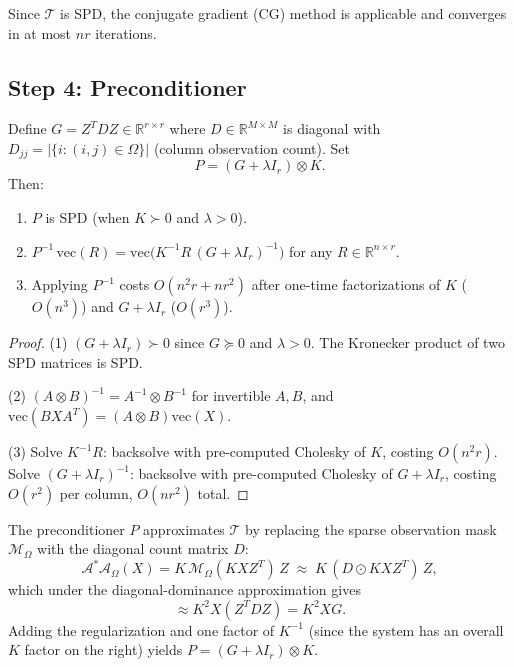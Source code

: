 Since $\mathcal T$ is SPD, the conjugate gradient (CG) method is applicable and converges in at most $nr$ iterations.

\subsection*{Step 4: Preconditioner}

\begin{proposition}\label{prop:q10-precond}
Define $G = Z^T D Z\in\mathbb R^{r\times r}$ where $D\in\mathbb R^{M\times M}$ is diagonal with $D_{jj} = |\{i:(i,j)\in\Omega\}|$ (column observation count). Set
\[
P = (G + \lambda I_r)\otimes K.
\]
Then:
\begin{enumerate}
\item $P$ is SPD (when $K\succ 0$ and $\lambda>0$).
\item $P^{-1}\,\mathrm{vec}(R) = \mathrm{vec}\bigl(K^{-1} R\,(G+\lambda I_r)^{-1}\bigr)$ for any $R\in\mathbb R^{n\times r}$.
\item Applying $P^{-1}$ costs $O(n^2 r + n r^2)$ after one-time factorizations of $K$ ($O(n^3)$) and $G+\lambda I_r$ ($O(r^3)$).
\end{enumerate}
\end{proposition}

\begin{proof}
(1) $(G+\lambda I_r)\succ 0$ since $G\succeq 0$ and $\lambda>0$. The Kronecker product of two SPD matrices is SPD.

(2) $(A\otimes B)^{-1} = A^{-1}\otimes B^{-1}$ for invertible $A,B$, and $\mathrm{vec}(BXA^T) = (A\otimes B)\mathrm{vec}(X)$.

(3) Solve $K^{-1}R$: backsolve with pre-computed Cholesky of $K$, costing $O(n^2 r)$. Solve $(G+\lambda I_r)^{-1}$: backsolve with pre-computed Cholesky of $G+\lambda I_r$, costing $O(r^2)$ per column, $O(nr^2)$ total.
\end{proof}

\begin{remark}
The preconditioner $P$ approximates $\mathcal T$ by replacing the sparse observation mask $\mathcal M_\Omega$ with the diagonal count matrix $D$:
\[
\mathcal A^*\mathcal A_\Omega(X) = K\,\mathcal M_\Omega(KXZ^T)\,Z
\;\approx\; K\,(D\odot KXZ^T)\,Z,
\]
which under the diagonal-dominance approximation gives
\[
\approx K^2 X (Z^T D Z) = K^2 X G.
\]
Adding the regularization and one factor of $K^{-1}$ (since the system has an overall $K$ factor on the right) yields $P = (G+\lambda I_r)\otimes K$.
\end{remark}

